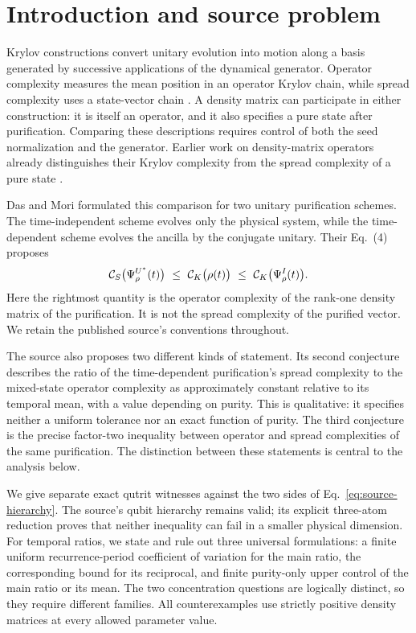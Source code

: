 \section{Introduction and source problem}\label{sec:introduction}
Krylov constructions convert unitary evolution into motion along a basis
generated by successive applications of the dynamical generator. Operator
complexity measures the mean position in an operator Krylov chain, while
spread complexity uses a state-vector chain
\cite{Parker2019,Balasubramanian2022}. A density matrix can participate in
either construction: it is itself an operator, and it also specifies a pure
state after purification. Comparing these descriptions requires control of
both the seed normalization and the generator. Earlier work on density-matrix
operators already distinguishes their Krylov complexity from the spread
complexity of a pure state \cite{Caputa2024}.

Das and Mori \cite{DasMori2026} formulated this comparison for two unitary
purification schemes. The time-independent scheme evolves only the physical
system, while the time-dependent scheme evolves the ancilla by the conjugate
unitary. Their Eq.~(4) proposes
\begin{equation}\label{eq:source-hierarchy}
 \mathcal C_S\bigl(\Psi_\rho^{U^*}(t)\bigr)
 \ \le\ \mathcal C_K\bigl(\rho(t)\bigr)
 \ \le\ \mathcal C_K\bigl(\Psi_\rho^I(t)\bigr).
\end{equation}
Here the rightmost quantity is the operator complexity of the rank-one
density matrix of the purification. It is not the spread complexity of the
purified vector. We retain the published source's conventions throughout.

The source also proposes two different kinds of statement. Its second
conjecture describes the ratio of the time-dependent purification's spread
complexity to the mixed-state operator complexity as approximately constant
relative to its temporal mean, with a value depending on purity. This is
qualitative: it specifies neither a uniform tolerance nor an exact function
of purity. The third conjecture is the precise factor-two inequality between
operator and spread complexities of the same purification. The distinction
between these statements is central to the analysis below.

We give separate exact qutrit witnesses against the two sides of
Eq.~\eqref{eq:source-hierarchy}. The source's qubit hierarchy remains valid;
its explicit three-atom reduction proves that neither inequality can fail in
a smaller physical dimension. For temporal ratios, we state and rule out
three universal formulations: a finite uniform recurrence-period coefficient
of variation for the main ratio, the corresponding bound for its reciprocal,
and finite purity-only upper control of the main ratio or its mean. The
two concentration questions are logically distinct, so they require different
families. All counterexamples use strictly positive density matrices at every
allowed parameter value.

